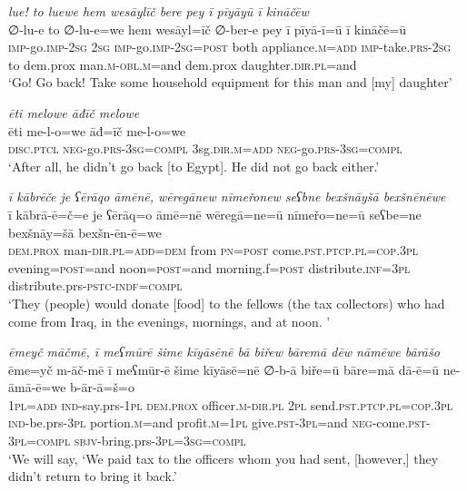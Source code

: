 \ea \label{ŽP.262}
\textit{lue! to luewe hem wesāylīč bere pey ī pīyāyū ī kināčēw} \\ 
\gll ∅-lu-e to ∅-lu-e=we hem wesāyl=īč ∅-ber-e pey ī pīyā-ī=ū ī kināčē=ū \\ 
 \textsc{imp-}go.\textsc{imp-}\textsc{2sg} \textsc{2sg} \textsc{imp-}go.\textsc{imp-}\textsc{2sg}\textsc{=\textsc{post}} both appliance\textsc{.m}\textsc{=add} \textsc{imp-}take\textsc{.prs}-\textsc{2sg} to dem.prox man\textsc{.m}\textsc{-obl}\textsc{.m}=and dem.prox daughter\textsc{.dir}\textsc{.pl}=and \\ 
\glt `Go! Go back! Take some household equipment for this man and [my] daughter'
\z 
 
\ea \label{ŽP.266}
\textit{ēti melowe āđīč melowe} \\ 
\gll ēti me-l-o=we āđ=īč me-l-o=we \\ 
 \textsc{disc.ptcl} \textsc{neg-}go\textsc{.prs}\textsc{-3sg}\textsc{=compl} 3sg\textsc{.dir}\textsc{.m}\textsc{=add} \textsc{neg-}go\textsc{.prs}\textsc{-3sg}\textsc{=compl} \\ 
\glt `After all, he didn’t go back [to Egypt]. He did not go back either.'
\z 
 
\ea \label{BP.38}
\textit{ī kābrēče je ʕērāqo āmēnē, wēregānew nīmeřonew seʕbne bexšnāyšā bexšnēnēwe} \\ 
\gll ī kābrā-ē=č=e je ʕērāq=o āmē=nē wēregā=ne=ū nīmeřo=ne=ū seʕbe=ne bexšnāy=šā bexšn-ēn-ē=we \\ 
 \textsc{dem.prox} man\textsc{-dir}\textsc{.pl}\textsc{=add}\textsc{=dem} from \textsc{pn}\textsc{=\textsc{post}} come\textsc{.pst}\textsc{.ptcp}\textsc{.pl}\textsc{=cop}\textsc{.3pl} evening\textsc{=\textsc{post}}=and noon\textsc{=\textsc{post}}=and morning.f\textsc{=\textsc{post}} distribute\textsc{.inf}\textsc{=3pl} distribute.prs\textsc{-pstc}\textsc{-indf}\textsc{=compl} \\ 
\glt `They (people) would donate [food] to the fellows (the tax collectors) who had come from Iraq, in the evenings, mornings, and at noon. '
\z 
 
\ea \label{BP.60}
\textit{ēmeyč māčmē, ī meʕmūrē šime kīyāsēnē bā biřew bāremā dēw nāmēwe bārāšo} \\ 
\gll ēme=yč m-āč-mē ī meʕmūr-ē šime kīyāsē=nē ∅-b-ā biře=ū bāre=mā dā-ē=ū ne-āmā-ē=we b-ār-ā=š=o \\ 
 \textsc{1pl}\textsc{=add} \textsc{ind-}say.prs\textsc{-\textsc{1pl}} \textsc{dem.prox} officer\textsc{.m}\textsc{-dir}\textsc{.pl} \textsc{2pl} send\textsc{.pst}\textsc{.ptcp}\textsc{.pl}\textsc{=cop}\textsc{.3pl} \textsc{ind-}be.prs\textsc{-3pl} portion\textsc{.m}=and profit\textsc{.m}\textsc{=\textsc{1pl}} give\textsc{.pst}\textsc{-3pl}=and \textsc{neg-}come\textsc{.pst}\textsc{-3pl}\textsc{=compl} \textsc{sbjv-}bring.prs\textsc{-3pl}\textsc{=3sg}\textsc{=compl} \\ 
\glt `We will say, ‘We paid tax to the officers whom you had sent, [however,] they didn’t return to bring it back.'
\z 
 
